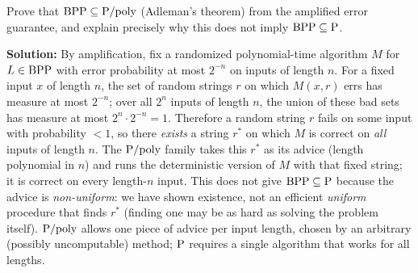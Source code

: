 \begin{exercise}[Intermediate]
Prove that $\text{BPP} \subseteq \text{P}/\text{poly}$ (Adleman's theorem) from the amplified error guarantee, and explain precisely why this does not imply $\text{BPP} \subseteq \text{P}$.
\end{exercise}
\textbf{Solution:} By amplification, fix a randomized polynomial-time algorithm $M$ for $L \in \text{BPP}$ with error probability at most $2^{-n}$ on inputs of length $n$. For a fixed input $x$ of length $n$, the set of random strings $r$ on which $M(x, r)$ errs has measure at most $2^{-n}$; over all $2^n$ inputs of length $n$, the union of these bad sets has measure at most $2^n \cdot 2^{-n} = 1$. Therefore a random string $r$ fails on some input with probability $< 1$, so there \emph{exists} a string $r^*$ on which $M$ is correct on \emph{all} inputs of length $n$. The $\text{P}/\text{poly}$ family takes this $r^*$ as its advice (length polynomial in $n$) and runs the deterministic version of $M$ with that fixed string; it is correct on every length-$n$ input. This does not give $\text{BPP} \subseteq \text{P}$ because the advice is \emph{non-uniform}: we have shown existence, not an efficient \emph{uniform} procedure that finds $r^*$ (finding one may be as hard as solving the problem itself). $\text{P}/\text{poly}$ allows one piece of advice per input length, chosen by an arbitrary (possibly uncomputable) method; $\text{P}$ requires a single algorithm that works for all lengths.

